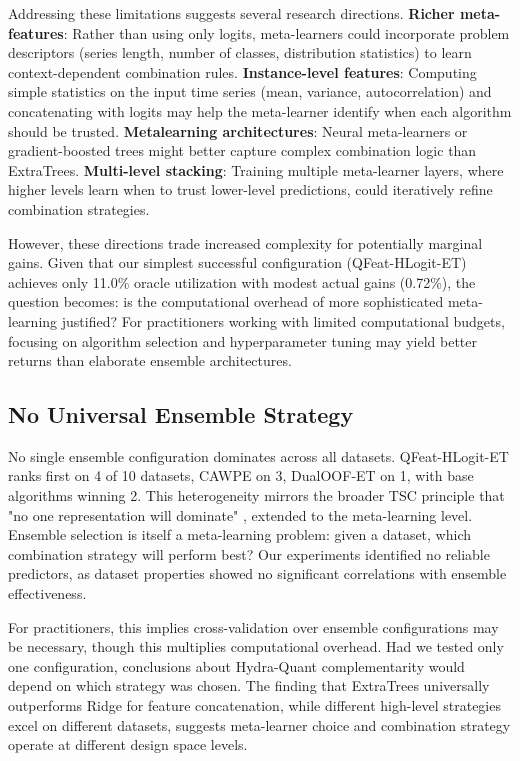 \documentclass[pdflatex,sn-basic]{sn-jnl}           %
\theoremstyle{thmstyleone}%
\theoremstyle{thmstyletwo}%
\theoremstyle{thmstylethree}%
\begin{document}
Addressing these limitations suggests several research directions. \textbf{Richer meta-features}: Rather than using only logits, meta-learners could incorporate problem descriptors (series length, number of classes, distribution statistics) to learn context-dependent combination rules. \textbf{Instance-level features}: Computing simple statistics on the input time series (mean, variance, autocorrelation) and concatenating with logits may help the meta-learner identify when each algorithm should be trusted. \textbf{Metalearning architectures}: Neural meta-learners or gradient-boosted trees might better capture complex combination logic than ExtraTrees. \textbf{Multi-level stacking}: Training multiple meta-learner layers, where higher levels learn when to trust lower-level predictions, could iteratively refine combination strategies.

However, these directions trade increased complexity for potentially marginal gains. Given that our simplest successful configuration (QFeat-HLogit-ET) achieves only 11.0\% oracle utilization with modest actual gains (0.72\%), the question becomes: is the computational overhead of more sophisticated meta-learning justified? For practitioners working with limited computational budgets, focusing on algorithm selection and hyperparameter tuning may yield better returns than elaborate ensemble architectures.

\subsection{No Universal Ensemble Strategy}

No single ensemble configuration dominates across all datasets. QFeat-HLogit-ET ranks first on 4 of 10 datasets, CAWPE on 3, DualOOF-ET on 1, with base algorithms winning 2. This heterogeneity mirrors the broader TSC principle that "no one representation will dominate" \citep{tsc-bakeoff}, extended to the meta-learning level. Ensemble selection is itself a meta-learning problem: given a dataset, which combination strategy will perform best? Our experiments identified no reliable predictors, as dataset properties showed no significant correlations with ensemble effectiveness.

For practitioners, this implies cross-validation over ensemble configurations may be necessary, though this multiplies computational overhead. Had we tested only one configuration, conclusions about Hydra-Quant complementarity would depend on which strategy was chosen. The finding that ExtraTrees universally outperforms Ridge for feature concatenation, while different high-level strategies excel on different datasets, suggests meta-learner choice and combination strategy operate at different design space levels.
\end{document}
